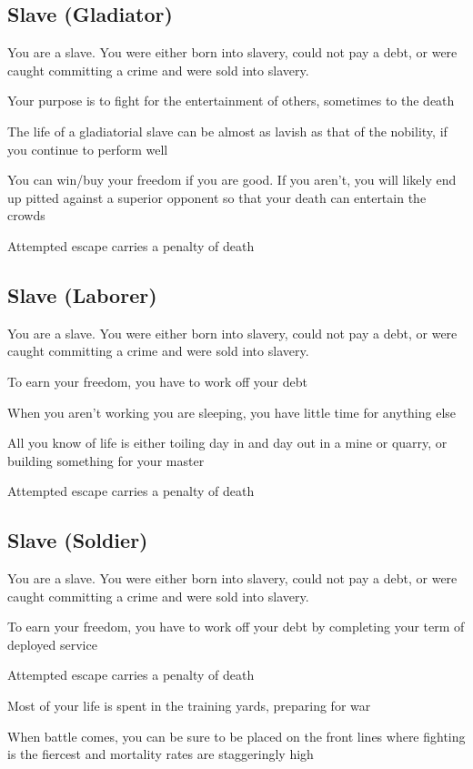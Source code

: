 \subsection{Slave (Gladiator)}

\begin{description}
    \item You are a slave. You were either born into slavery, could not pay a debt, or were caught committing a crime and were sold into slavery.
    \item Your purpose is to fight for the entertainment of others, sometimes to the death
    \item The life of a gladiatorial slave can be almost as lavish as that of the nobility, if you continue to perform well
    \item You can win/buy your freedom if you are good. If you aren’t, you will likely end up pitted against a superior opponent so that your death can entertain the crowds
    \item Attempted escape carries a penalty of death
\end{description}

\subsection{Slave (Laborer)}

\begin{description}
    \item You are a slave. You were either born into slavery, could not pay a debt, or were caught committing a crime and were sold into slavery.
    \item To earn your freedom, you have to work off your debt
    \item When you aren’t working you are sleeping, you have little time for anything else
    \item All you know of life is either toiling day in and day out in a mine or quarry, or building something for your master
    \item Attempted escape carries a penalty of death
\end{description}

\subsection{Slave (Soldier)}

\begin{description}
    \item You are a slave. You were either born into slavery, could not pay a debt, or were caught committing a crime and were sold into slavery.
    \item To earn your freedom, you have to work off your debt by completing your term of deployed service
    \item Attempted escape carries a penalty of death
    \item Most of your life is spent in the training yards, preparing for war
    \item When battle comes, you can be sure to be placed on the front lines where fighting is the fiercest and mortality rates are staggeringly high
\end{description}

